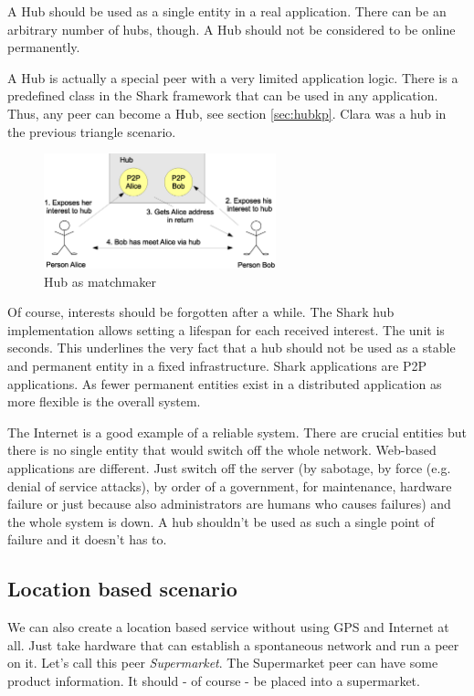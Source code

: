 A Hub should be used as a single entity in a real application. There can be an arbitrary number of hubs, though. A Hub should not be considered to be online permanently.

A Hub is actually a special peer with a very limited application logic. There is a predefined class in the Shark framework that can be used in any application. Thus, any peer can become a Hub, see section \ref{sec:hubkp}. Clara was a hub in the previous triangle scenario.

\begin{figure}[t]
\centering
\includegraphics[width=0.60\textwidth]{hub.eps}
\caption{Hub as matchmaker}
\label{fig:hub}
\end{figure}

Of course, interests should be forgotten after a while. The Shark hub implementation allows setting a lifespan for each received interest. The unit is seconds. This underlines the very fact that a hub should not be used as a stable and permanent entity in a fixed infrastructure. Shark applications are P2P applications. As fewer permanent entities exist in a distributed application as more flexible is the overall system.

The Internet is a good example of a reliable system. There are crucial entities but there is no single entity that would switch off the whole network. Web-based applications are different. Just switch off the server (by sabotage, by force (e.g. denial of service attacks), by order of a government, for maintenance, hardware failure or just because also administrators are humans who causes failures) and the whole system is down. A hub shouldn't be used as such a single point of failure and it doesn't has to.

\subsection{Location based scenario}
We can also create a location based service without using GPS and Internet at all. Just take hardware that can establish a spontaneous network and run a peer on it. Let's call this peer {\it Supermarket}. The Supermarket peer can have some product information. It should - of course - be placed into a supermarket.

